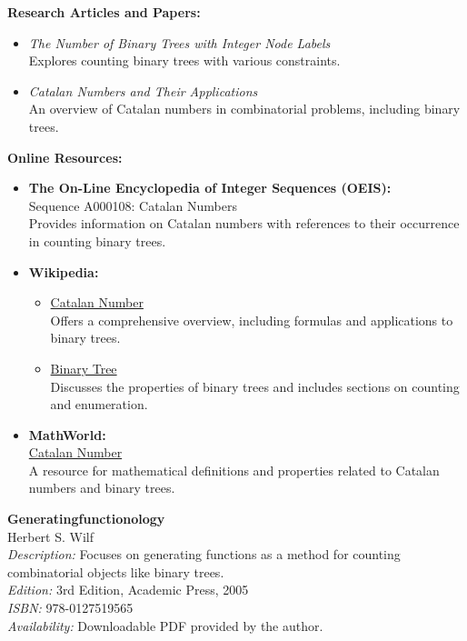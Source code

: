 \documentclass{article}
\begin{document}
\textbf{Research Articles and Papers:}
\begin{itemize}
    \item \textit{The Number of Binary Trees with Integer Node Labels} \\
    Explores counting binary trees with various constraints.
    \item \textit{Catalan Numbers and Their Applications} \\
    An overview of Catalan numbers in combinatorial problems, including binary trees.
\end{itemize}

\textbf{Online Resources:}
\begin{itemize}
    \item \textbf{The On-Line Encyclopedia of Integer Sequences (OEIS):} \\
    Sequence A000108: Catalan Numbers \\
    Provides information on Catalan numbers with references to their occurrence in counting binary trees.
    \item \textbf{Wikipedia:}
    \begin{itemize}
        \item \href{https://en.wikipedia.org/wiki/Catalan_number}{Catalan Number} \\
        Offers a comprehensive overview, including formulas and applications to binary trees.
        \item \href{https://en.wikipedia.org/wiki/Binary_tree}{Binary Tree} \\
        Discusses the properties of binary trees and includes sections on counting and enumeration.
    \end{itemize}
    \item \textbf{MathWorld:} \\
    \href{https://mathworld.wolfram.com/CatalanNumber.html}{Catalan Number} \\
    A resource for mathematical definitions and properties related to Catalan numbers and binary trees.
\end{itemize}

\textbf{Generatingfunctionology} \\
Herbert S. Wilf \\
\textit{Description:} Focuses on generating functions as a method for counting combinatorial objects like binary trees. \\
\textit{Edition:} 3rd Edition, Academic Press, 2005 \\
\textit{ISBN:} 978-0127519565 \\
\textit{Availability:} Downloadable PDF provided by the author.
\end{document}

